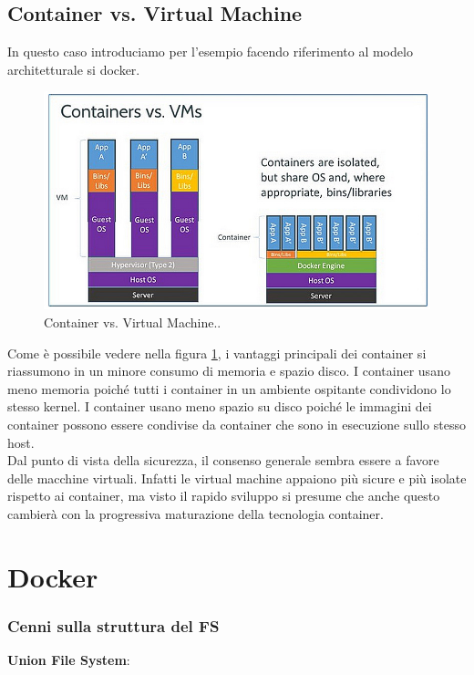 \documentclass[a4paper,12pt,openright,twoside]{report}
\begin{document}
\subsection{Container vs. Virtual Machine}
In questo caso introduciamo per l'esempio facendo riferimento al modelo architetturale si docker.
\begin{figure}[H]
	\begin{center}
		\includegraphics[width=0.99\columnwidth]{img/ContainersOperations-2_fig03.jpg}
		\caption{Container vs. Virtual Machine..}
		\label{img:arch_comp}
	\end{center}
\end{figure}
Come è possibile vedere nella figura \ref{img:arch_comp}, i vantaggi principali dei container si riassumono in un minore consumo di memoria e spazio disco. I container usano meno memoria poiché tutti i container in un ambiente ospitante condividono lo stesso kernel. I container usano meno spazio su disco poiché le immagini dei container possono essere condivise da container che sono in esecuzione sullo stesso host.\\
Dal punto di vista della sicurezza, il consenso generale sembra essere a favore delle macchine virtuali. Infatti le virtual machine appaiono più sicure e più isolate rispetto ai container, ma visto il rapido sviluppo si presume che anche questo cambierà con la progressiva maturazione della tecnologia container.
\section{Docker}

\subsubsection{Cenni sulla struttura del FS}
\textbf{Union File System}:

\end{document}
